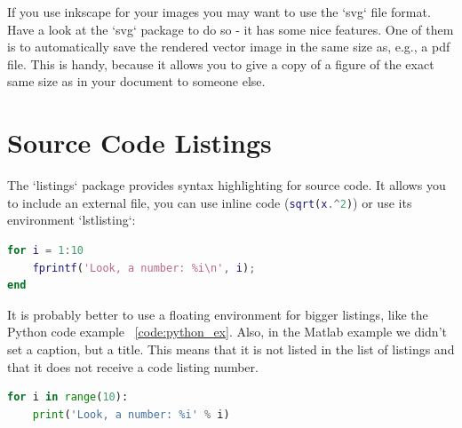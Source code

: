 If you use inkscape for your images you may want to use the `svg` file format.
Have a look at the `svg` package to do so - it has some nice features.
One of them is to automatically save the rendered vector image in the same size as, e.g., a pdf file.
This is handy, because it allows you to give a copy of a figure of the exact same size as in your document to someone else.

\section{Source Code Listings}
The `listings` package provides syntax highlighting for source code.
It allows you to include an external file, you can use inline code
(\lstinline[language=matlab]!sqrt(x.^2)!)
or use its environment `lstlisting`:

\begin{lstlisting}[language=matlab, title={A simple MATLAB program.}]
for i = 1:10
    fprintf('Look, a number: %i\n', i);
end
\end{lstlisting}

It is probably better to use a floating environment for bigger listings, like the Python code example ~\vref{code:python_ex}.
Also, in the Matlab example we didn't set a caption, but a title.
This means that it is not listed in the list of listings and that it does not receive a code listing number.
\begin{lstlisting}[float, language=python, caption={A simple Python program.},
                   label=code:python_ex]
for i in range(10):
    print('Look, a number: %i' % i)
\end{lstlisting}
